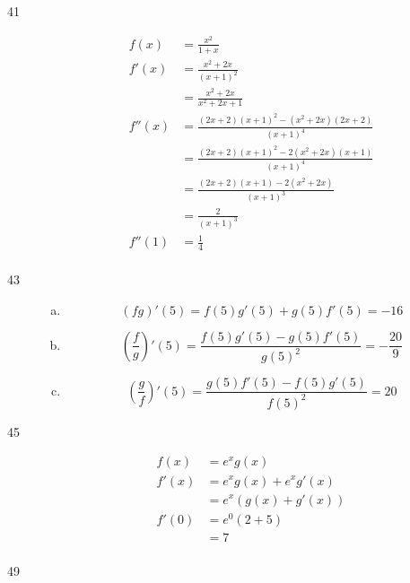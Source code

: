 \documentclass[letterpaper, landscape]{exam}
\begin{document}
\begin{description}
    \item[41]
      \begin{align*}
        f(x)   & = \frac{x^2}{1 + x} \\
        f'(x)  & = \frac{x^2 + 2x}{(x + 1)^2} \\
               & = \frac{x^2 + 2x}{x^2 + 2x + 1} \\
        f''(x) & = \frac{(2x + 2)(x + 1)^2 - \left( x^2 + 2x \right)(2x + 2)}{(x + 1)^4} \\
               & = \frac{(2x + 2)(x + 1)^2 - 2 \left( x^2 + 2x \right)(x + 1)}{(x + 1)^4} \\
               & = \frac{(2x + 2)(x + 1) - 2 \left( x^2 + 2x \right)}{(x + 1)^3} \\
               & = \frac{2}{(x + 1)^3} \\
        f''(1) & = \boxed{ \frac{1}{4} } \\
      \end{align*}

    \newpage

    \item[43]
      \begin{enumerate}[(a)]

        \item 
          \[
            (fg)'(5) = f(5)g'(5) + g(5)f'(5) = \boxed{ -16 }
          \]

        \item 
          \[
            \left( \frac{f}{g} \right)'(5) = \frac{f(5)g'(5) - g(5)f'(5)}{g(5)^2} 
              = \boxed{ - \frac{20}{9} }
          \]

        \item 
          \[
            \left( \frac{g}{f} \right)'(5) = \frac{g(5)f'(5) - f(5)g'(5)}{f(5)^2} = \boxed{ 20 }
          \]

      \end{enumerate}

    \item[45]
      \begin{align*}
        f(x)  & = e^x g(x) \\
        f'(x) & = e^x g(x) + e^x g'(x) \\
              & = e^x (g(x) + g'(x)) \\
        f'(0) & = e^0 ( 2 + 5 ) \\
              & = \boxed{ 7 } \\
      \end{align*}

    \item[49]
      \begin{enumerate}[(a)]


\end{enumerate}
\end{description}
\end{document}
